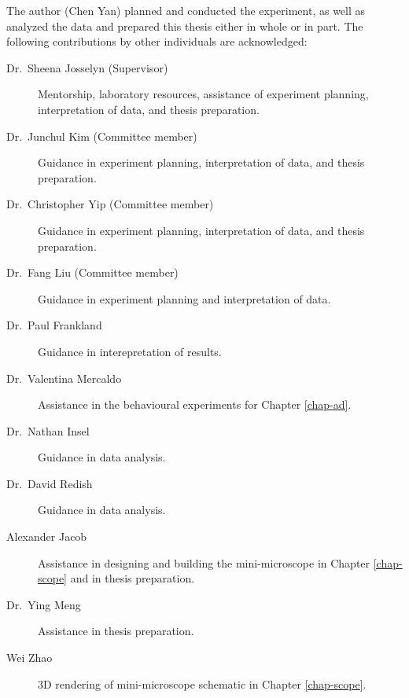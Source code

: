 The author (Chen Yan) planned and conducted the experiment, as well as analyzed the data and prepared this thesis either in whole or in part. The following contributions by other individuals are acknowledged:
\begin{description}

\item[Dr.~Sheena Josselyn (Supervisor)] Mentorship, laboratory resources, assistance of experiment planning, interpretation of data, and thesis preparation.

\item[Dr.~Junchul Kim (Committee member)] Guidance in experiment planning, interpretation of data, and thesis preparation.

\item[Dr.~Christopher Yip (Committee member)] Guidance in experiment planning, interpretation of data, and thesis preparation.
\item[Dr.~Fang Liu (Committee member)] Guidance in experiment planning and interpretation of data.

\item[Dr.~Paul Frankland] Guidance in interepretation of results.

\item[Dr.~Valentina Mercaldo] Assistance in the behavioural experiments for Chapter \ref{chap-ad}.

\item[Dr.~Nathan Insel] Guidance in data analysis.

\item[Dr.~David Redish] Guidance in data analysis. 

\item[Alexander Jacob] Assistance in designing and building the mini-microscope in Chapter \ref{chap-scope} and in thesis preparation.
\item[Dr.~Ying Meng] Assistance in thesis preparation.
\item[Wei Zhao] 3D rendering of mini-microscope schematic in Chapter \ref{chap-scope}.



\end{description}
